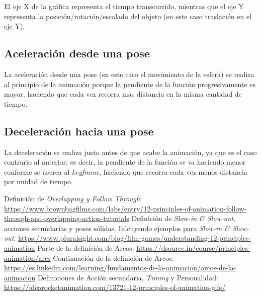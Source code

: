 \documentclass{article}
\begin{document}
El eje X de la gráfica representa el tiempo transcurrido, mientras que el eje Y representa la posición/rotación/escalado del objeto (en este caso traslación en el eje Y).

\subsection{Aceleración desde una pose}
La aceleración desde una pose (en este caso el movimiento de la esfera) se realiza al principio de la animación porque la pendiente de la función progresivamente es mayor, haciendo que cada vez recorra más distancia en la misma cantidad de tiempo.
\subsection{Deceleración hacia una pose}

La deceleración se realiza justo antes de que acabe la animación, ya que es el caso contrario al anterior; es decir, la pendiente de la función se va haciendo menor conforme se acerca al \textit{keyframe}, haciendo que recorra cada vez menos distancia por unidad de tiempo.


\begin{thebibliography}{1}
     Definición de \textit{Overlapping y Follow Through}: \url{https://www.brownbagfilms.com/labs/entry/12-principles-of-animation-follow-through-and-overlapping-action-tutorials} 
     Definición de \textit{Slow-in \& Slow-out}, acciones secundarias y poses sólidas. Inlcuyendo ejemplos para \textit{Slow-in \& Slow-out}: \url{https://www.pluralsight.com/blog/film-games/understanding-12-principles-animation}
     Parte de la definición de Arcos: \url{https://dsource.in/course/principles-animation/arcs}
     Continuación de la definición de Arcos: \url{https://es.linkedin.com/learning/fundamentos-de-la-animacion/arcos-de-la-animacion}
     Definiciones de Acción secundaria, \textit{Timing} y Personalidad: \url{https://idearocketanimation.com/13721-12-principles-of-animation-gifs/}
\end{thebibliography}
\end{document}
